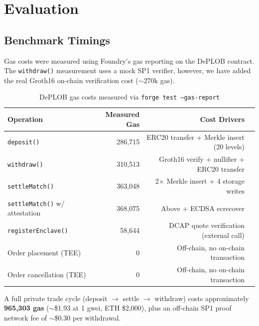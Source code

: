\documentclass[12pt,a4paper]{article}
\begin{document}
\section{Evaluation}
\subsection{Benchmark Timings}

Gas costs were measured using Foundry's gas reporting on the DePLOB contract. The \texttt{withdraw()} measurement uses a mock SP1 verifier, however, we have added the real Groth16 on-chain verification cost (${\sim}$270k gas). 

\begin{table}[H]
\centering
\begin{tabular}{|l|r|r|l|}
\hline
\textbf{Operation} & \textbf{Measured Gas} & \textbf{Cost Drivers} \\
\hline
\texttt{deposit()} & 286,715 & ERC20 transfer + Merkle insert (20 levels) \\
\hline
\texttt{withdraw()} & 310,513 & Groth16 verify + nullifier + ERC20 transfer \\
\hline
\texttt{settleMatch()} & 363,048  & 2$\times$ Merkle insert + 4 storage writes \\
\hline
\texttt{settleMatch()} w/ attestation & 368,075 & Above + ECDSA ecrecover \\
\hline
\texttt{registerEnclave()} & 58,644 & DCAP quote verification (external call) \\
\hline
Order placement (TEE) & 0 & Off-chain, no on-chain transaction \\
\hline
Order cancellation (TEE) & 0 & Off-chain, no on-chain transaction \\
\hline
\end{tabular}
\caption{DePLOB gas costs measured via \texttt{forge test --gas-report}}
\label{tab:deplob_gas}
\end{table}

\noindent A full private trade cycle (deposit $\rightarrow$ settle $\rightarrow$ withdraw) costs approximately \textbf{965,303 gas} (${\sim}$\$1.93 at 1 gwei, ETH \$2,000), plus an off-chain SP1 proof network fee of ${\sim}$\$0.30 per withdrawal.
\end{document}
